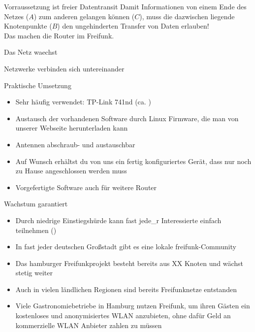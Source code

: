 \documentclass[aspectratio=43]{beamer}
\begin{document}
\begin{frame}{Vorraussetzung ist freier Datentransit} %
	Damit Informationen von einem Ende des Netzes ($A$) zum anderen gelangen können ($C$), muss die dazwischen liegende Knotenpunkte ($B$) den ungehinderten Transfer von Daten erlauben!\\
	Das machen die Router im Freifunk.
\end{frame}

\begin{frame}{Das Netz waechst}

\end{frame}

\begin{frame}{Netzwerke verbinden sich untereinander}

\end{frame}

\begin{frame}{Praktische Umsetzung}
	\begin{itemize}
		\item Sehr häufig verwendet: TP-Link 741nd (ca. )
		\item Austausch der vorhandenen Software durch Linux Firmware, die man von unserer Webseite herunterladen kann
		\item Antennen abschraub- und austauschbar
		\item Auf Wunsch erhältst du von uns ein fertig konfiguriertes Gerät, dass nur noch zu Hause angeschlossen werden muss
		\item Vorgefertigte Software auch für weitere Router
	\end{itemize}
\end{frame}

\begin{frame}{Wachstum garantiert}
	\begin{itemize}
		\item Durch niedrige Einstiegshürde kann fast jede\_r Interessierte einfach teilnehmen ()
		\item In fast jeder deutschen Großstadt gibt es eine lokale freifunk-Community
		\item Das hamburger Freifunkprojekt besteht bereits aus XX Knoten und wächst stetig weiter %
		\item Auch in vielen ländlichen Regionen sind bereits Freifunknetze entstanden
		\item Viele Gastronomiebetriebe in Hamburg nutzen Freifunk, um ihren Gästen ein kostenloses und anonymisiertes WLAN anzubieten, ohne dafür Geld an kommerzielle WLAN Anbieter zahlen zu müssen %
	\end{itemize}
\end{frame}
\end{document}
